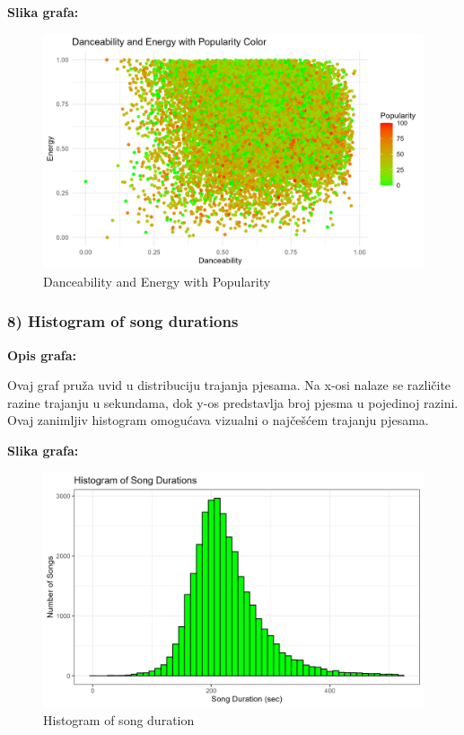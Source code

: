 	\textbf{Slika grafa:}
	\begin{figure}[H]
		\includegraphics[scale=0.9]{slike/Dance-Energy-popularity.png}
		\centering
		\caption{ Danceability and Energy with Popularity}
		
	\end{figure}


	\subsubsection{8) Histogram of song durations}
    
    \textbf{Opis grafa:}
    
Ovaj graf pruža uvid u distribuciju trajanja pjesama. Na x-osi nalaze se različite razine trajanju u sekundama, dok y-os predstavlja broj pjesma u pojedinoj razini. Ovaj zanimljiv histogram omogućava vizualni o najčešćem trajanju pjesama.
    

    \textbf{Slika grafa:}
    \begin{figure}[H]
        \includegraphics[scale=0.9]{slike/Histogram of song durations.png}
        \centering
        \caption{Histogram of song duration}
        
    \end{figure}



